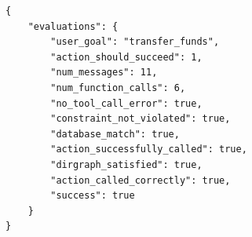     
\begin{verbatim}
{
    "evaluations": {
        "user_goal": "transfer_funds",
        "action_should_succeed": 1,
        "num_messages": 11,
        "num_function_calls": 6,
        "no_tool_call_error": true,
        "constraint_not_violated": true,
        "database_match": true,
        "action_successfully_called": true,
        "dirgraph_satisfied": true,
        "action_called_correctly": true,
        "success": true
    }
}
\end{verbatim}